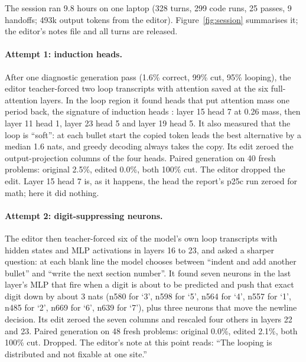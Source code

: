 \documentclass[11pt]{article}
\begin{document}
The session ran 9.8 hours on one laptop (328 turns, 299 code runs, 25 passes, 9 handoffs; 493k output tokens from the editor). Figure~\ref{fig:session} summarises it; the editor's notes file and all turns are released.

\paragraph{Attempt 1: induction heads.} After one diagnostic generation pass (1.6\% correct, 99\% cut, 95\% looping), the editor teacher-forced two loop transcripts with attention saved at the six full-attention layers. In the loop region it found heads that put attention mass one period back, the signature of induction heads \cite{induction}: layer 15 head 7 at 0.26 mass, then layer 11 head 1, layer 23 head 5 and layer 19 head 5. It also measured that the loop is ``soft'': at each bullet start the copied token leads the best alternative by a median 1.6 nats, and greedy decoding always takes the copy. Its edit zeroed the output-projection columns of the four heads. Paired generation on 40 fresh problems: original 2.5\%, edited 0.0\%, both 100\% cut. The editor dropped the edit. Layer 15 head 7 is, as it happens, the head the report's p25c run zeroed for math; here it did nothing.

\paragraph{Attempt 2: digit-suppressing neurons.} The editor then teacher-forced six of the model's own loop transcripts with hidden states and MLP activations in layers 16 to 23, and asked a sharper question: at each blank line the model chooses between ``indent and add another bullet'' and ``write the next section number''. It found seven neurons in the last layer's MLP that fire when a digit is about to be predicted and push that exact digit down by about 3 nats (n580 for `3', n598 for `5', n564 for `4', n557 for `1', n485 for `2', n669 for `6', n639 for `7'), plus three neurons that move the newline decision. Its edit zeroed the seven columns and rescaled four others in layers 22 and 23. Paired generation on 48 fresh problems: original 0.0\%, edited 2.1\%, both 100\% cut. Dropped. The editor's note at this point reads: ``The looping is distributed and not fixable at one site.''
\end{document}
